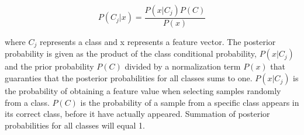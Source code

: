 \begin{equation}
P(C_j|x) = \frac{P(x|C_j)P(C)}{P(x)}
\end{equation}

where $C_j$ represents a class and x represents a feature vector. The posterior probability is given as the product of the class conditional probability, $P(x|C_j)$ and the prior probability $P(C)$ divided by a normalization term $P(x)$ that guaranties that the posterior probabilities for all classes sums to one. $P(x|C_j)$ is the probability of obtaining a feature value when selecting samples randomly from a class. $P(C)$ is the probability of a sample from a specific class appears in its correct class, before it have actually appeared. Summation of posterior probabilities for all classes will equal 1.
